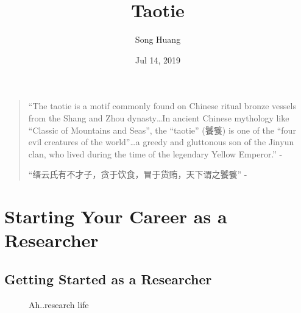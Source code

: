 \documentclass[letterpaper,10pt,english]{sphinxmanual}
\title{Taotie}
\date{Jul 14, 2019}
\author{Song Huang}
\let\sphinxpxdimen\pdfpxdimen\else\newdimen\sphinxpxdimen
\begin{document}
\pagestyle{empty}
\sphinxmaketitle
\pagestyle{plain}
\sphinxtableofcontents
\pagestyle{normal}
\label{\detokenize{index::doc}}

\begin{quote}

“The taotie is a motif commonly found on Chinese ritual bronze vessels from the Shang and Zhou
dynasty…In ancient Chinese mythology like “Classic of Mountains and Seas”, the “taotie” (饕餮)
is one of the “four evil creatures of the world”…a greedy and gluttonous son of the Jinyun
clan, who lived during the time of the
legendary Yellow Emperor.” - 

“缙云氏有不才子，贪于饮食，冒于货贿，天下谓之饕餮”
- 
\end{quote}

\noindent\sphinxincludegraphics[width=600\sphinxpxdimen]{{taotie_logo}.png}


\chapter{Starting Your Career as a Researcher}
\label{\detokenize{index:starting-your-career-as-a-researcher}}

\section{Getting Started as a Researcher}
\label{\detokenize{resource/research/getting_started:getting-started-as-a-researcher}}\label{\detokenize{resource/research/getting_started::doc}}
\begin{figure}[htbp]
\centering
\capstart

\noindent{}
\caption{Ah..research life}\label{\detokenize{resource/research/getting_started:id1}}\end{figure}
\end{document}
